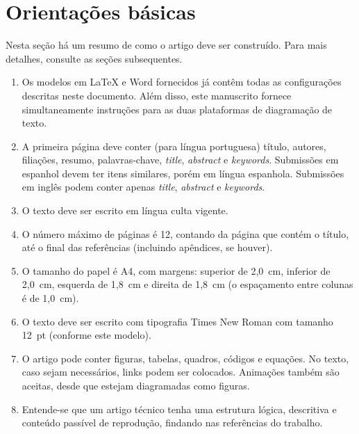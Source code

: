 \section{Orientações básicas}

Nesta seção há um resumo de como o artigo deve ser construído. Para mais detalhes, consulte as seções subsequentes.

\vspace{-8pt}
\begin{enumerate} \itemsep=2pt
    \item Os modelos em LaTeX e Word fornecidos já contêm todas as configurações descritas neste documento. Além disso, este manuscrito fornece simultaneamente instruções para as duas plataformas de diagramação de texto.
	\item A primeira página deve conter (para língua portuguesa) título, autores, filiações, resumo, palavras-chave, \textit{title}, \textit{abstract} e \textit{keywords}.
	Submissões em espanhol devem ter itens similares, porém em língua espanhola. Submissões em inglês podem conter apenas \textit{title}, \textit{abstract} e \textit{keywords}.
	\item O texto deve ser escrito em língua culta vigente.
	\item O número máximo de páginas é 12, contando da página que contém o título, até o final das referências (incluindo apêndices, se houver).
	\item O tamanho do papel é A4, com margens: superior de 2,0~cm, inferior de 2,0~cm, esquerda de 1,8~cm e direita de 1,8~cm (o espaçamento entre colunas é de 1,0~cm).
	\item O texto deve ser escrito com tipografia Times New Roman com tamanho 12~pt (conforme este modelo).
	\item O artigo pode conter figuras, tabelas, quadros, códigos e equações. No texto, caso sejam necessários, links podem ser colocados. Animações também são aceitas, desde que estejam diagramadas como figuras.
	\item Entende-se que um artigo técnico tenha uma estrutura lógica, descritiva e conteúdo passível de reprodução, findando nas referências do trabalho.
\end{enumerate}


